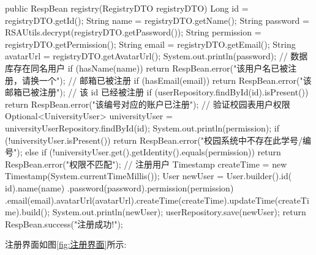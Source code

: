 \begin{Java}
public RespBean registry(RegistryDTO registryDTO) {
    Long id = registryDTO.getId();
    String name = registryDTO.getName();
    String password = RSAUtils.decrypt(registryDTO.getPassword());
    String permission = registryDTO.getPermission();
    String email = registryDTO.getEmail();
    String avatarUrl = registryDTO.getAvatarUrl();
    System.out.println(password);
    // 数据库存在同名用户
    if (hasName(name))
    return RespBean.error("该用户名已被注册，请换一个");
    // 邮箱已被注册
    if (hasEmail(email))
    return RespBean.error("该邮箱已被注册");
    // 该 id 已经被注册
    if (userRepository.findById(id).isPresent())
        return RespBean.error("该编号对应的账户已注册");
    // 验证校园表用户权限
    Optional<UniversityUser> universityUser = universityUserRepository.findById(id);
    System.out.println(permission);
    if (!universityUser.isPresent())
        return RespBean.error("校园系统中不存在此学号/编号");
    else if (!universityUser.get().getIdentity().equals(permission))
        return RespBean.error("权限不匹配");
    // 注册用户
    Timestamp createTime = new Timestamp(System.currentTimeMillis());
    User newUser = User.builder().id(
            id).name(name)
            .password(password).permission(permission)
            .email(email).avatarUrl(avatarUrl).createTime(createTime).updateTime(createTime).build();
    System.out.println(newUser);
    userRepository.save(newUser);
    return RespBean.success("注册成功!");
}
\end{Java}



注册界面如图\ref{fig:注册界面}所示:

